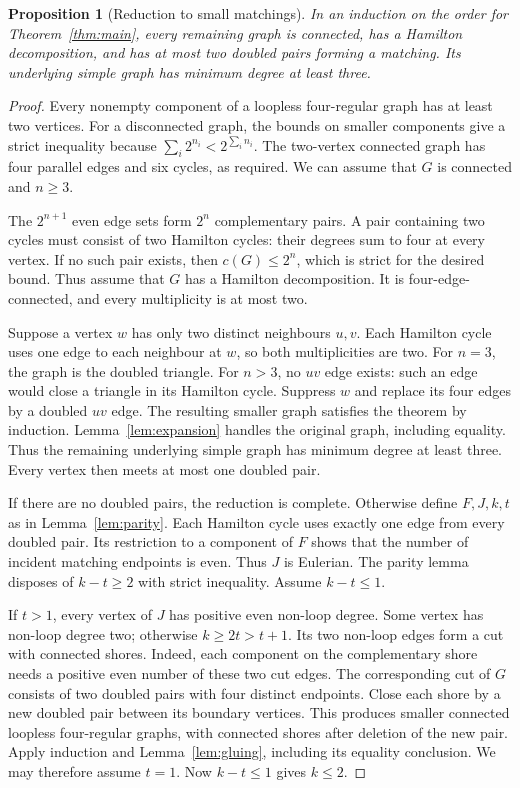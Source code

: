 \documentclass[11pt]{article}
\newtheorem{proposition}[theorem]{Proposition}
\begin{document}
\begin{proposition}[Reduction to small matchings]\label{prop:reduction}
In an induction on the order for Theorem~\ref{thm:main}, every remaining graph is connected, has a Hamilton decomposition,
and has at most two doubled pairs forming a matching.
Its underlying simple graph has minimum degree at least three.
\end{proposition}

\begin{proof}
Every nonempty component of a loopless four-regular graph has at least two vertices.
For a disconnected graph, the bounds on smaller components give a strict inequality because
$\sum_i2^{n_i}<2^{\sum_i n_i}$.
The two-vertex connected graph has four parallel edges and six cycles, as required.
We can assume that $G$ is connected and $n\ge3$.

The $2^{n+1}$ even edge sets form $2^n$ complementary pairs.
A pair containing two cycles must consist of two Hamilton cycles: their degrees sum to four at every vertex.
If no such pair exists, then $c(G)\le2^n$, which is strict for the desired bound.
Thus assume that $G$ has a Hamilton decomposition.
It is four-edge-connected, and every multiplicity is at most two.

Suppose a vertex $w$ has only two distinct neighbours $u,v$.
Each Hamilton cycle uses one edge to each neighbour at $w$, so both multiplicities are two.
For $n=3$, the graph is the doubled triangle.
For $n>3$, no $uv$ edge exists: such an edge would close a triangle in its Hamilton cycle.
Suppress $w$ and replace its four edges by a doubled $uv$ edge.
The resulting smaller graph satisfies the theorem by induction.
Lemma~\ref{lem:expansion} handles the original graph, including equality.
Thus the remaining underlying simple graph has minimum degree at least three.
Every vertex then meets at most one doubled pair.

If there are no doubled pairs, the reduction is complete.
Otherwise define $F,J,k,t$ as in Lemma~\ref{lem:parity}.
Each Hamilton cycle uses exactly one edge from every doubled pair.
Its restriction to a component of $F$ shows that the number of incident matching endpoints is even.
Thus $J$ is Eulerian.
The parity lemma disposes of $k-t\ge2$ with strict inequality.
Assume $k-t\le1$.

If $t>1$, every vertex of $J$ has positive even non-loop degree.
Some vertex has non-loop degree two; otherwise $k\ge2t>t+1$.
Its two non-loop edges form a cut with connected shores.
Indeed, each component on the complementary shore needs a positive even number of these two cut edges.
The corresponding cut of $G$ consists of two doubled pairs with four distinct endpoints.
Close each shore by a new doubled pair between its boundary vertices.
This produces smaller connected loopless four-regular graphs, with connected shores after deletion of the new pair.
Apply induction and Lemma~\ref{lem:gluing}, including its equality conclusion.
We may therefore assume $t=1$.
Now $k-t\le1$ gives $k\le2$.
\end{proof}
\end{document}
